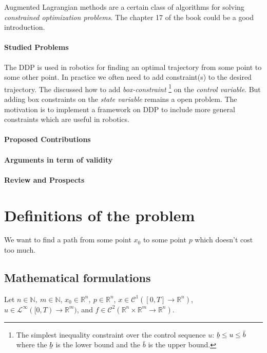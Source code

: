 \documentclass{report}
\begin{document}
Augmented Lagrangian methods are a certain class of algorithms for solving \emph{constrained optimization problems}. The chapter 17 of the book \cite{NoceWrig06} could be a good introduction. 

\subsubsection{Studied Problems}
The DDP is used in robotics for finding an optimal trajectory from some point to some other point. In practice we often need to add constraint(s) to the desired trajectory. The \cite{TassaICRA14} discussed how to add \emph{box-constraint} \footnote{The simplest inequality constraint over the control sequence $u$: $\underaccent{\bar}{b} \le u \le \bar{b}$ where the $\underaccent{\bar}{b}$ is the lower bound and the $\bar{b}$ is the upper bound.} on the \emph{control variable}. But adding box constraints on the \emph{state variable} remains a open problem. The motivation is to implement a framework on DDP to include more general constraints which are useful in robotics.

\subsubsection{Proposed Contributions}

\subsubsection{Arguments in term of validity}


\subsubsection{Review and Prospects}



\chapter{Definitions of the problem}
We want to find a path from some point $x_0$ to some point $p$ which doesn't cost too much.

\section{Mathematical formulations}
Let $n\in \mathbb{N}, \ m \in \mathbb{N}$, $x_0\in \mathbb{R}^n, \ p \in \mathbb{R}^n$, $x \in \mathscr{C}^1([0, T] \to \mathbb{R}^n)$, $u \in \mathscr{L}^\infty([0, T) \to \mathbb{R}^m)$, and $f \in  \mathscr{C}^2(\mathbb{R}^n \times \mathbb{R}^m \to \mathbb{R}^n)$. 
\end{document}
